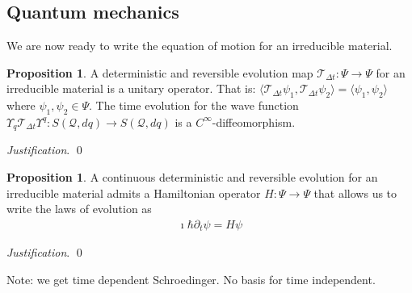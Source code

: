 \documentclass[aps,pra,10pt,twocolumn,floatfix,nofootinbib]{revtex4-1}
\numberwithin{equation}{section}
\theoremstyle{definition}
\newtheorem{prop}[equation]{Proposition}
\newenvironment{justification}{\emph{Justification}.}{\qed}
\begin{document}
\subsection{Quantum mechanics}

We are now ready to write the equation of motion for an irreducible material.

\begin{prop}\label{unitary_evolution}
	A deterministic and reversible evolution map $\mathcal{T}_{\Delta t}: \Psi \rightarrow \Psi$ for an irreducible material is a unitary operator. That is: $\langle \mathcal{T}_{\Delta t} \psi_1, \mathcal{T}_{\Delta t} \psi_2 \rangle = \langle \psi_1 , \psi_2 \rangle$ where $\psi_1, \psi_2 \in \Psi$. The time evolution for the wave function $\Upsilon_q \mathcal{T}_{\Delta t} \Upsilon^q : S(\mathcal{Q}, dq) \rightarrow S(\mathcal{Q}, dq)$ is a $C^{\infty}$-diffeomorphism.
\end{prop}

\begin{justification}
\end{justification}
	
	
\begin{prop}\label{prop:schroedinger_equation}
	A continuous deterministic and reversible evolution for an irreducible material admits a Hamiltonian operator $H : \Psi \rightarrow \Psi$ that allows us to write the laws of evolution as
	\begin{align*}
	\imath \hbar \partial_t \psi = H \psi
	\end{align*}
\end{prop}

\begin{justification}
\end{justification}

Note: we get time dependent Schroedinger. No basis for time independent.


\end{document}
